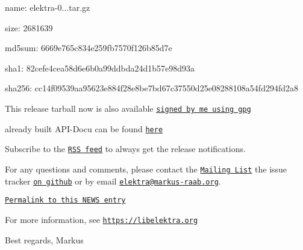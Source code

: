 \begin{DoxyItemize}
\item name\+: elektra-\/0...\+tar.\+gz
\item size\+: 2681639
\item md5sum\+: 6669e765c834e259fb7570f126b85d7e
\item sha1\+: 82cefe4cea58d6e6b0a99ddbda24d1b57e98d93a
\item sha256\+: cc14f09539aa95623e884f28e8be7bd67c37550d25e08288108a54fd294fd2a8
\end{DoxyItemize}

This release tarball now is also available \href{https://www.libelektra.org/ftp/elektra/releases/elektra-0.8.19.tar.gz.gpg}{\tt signed by me using gpg}

already built A\+P\+I-\/\+Docu can be found \href{https://doc.libelektra.org/api/0.8.19/html/}{\tt here}

Subscribe to the \href{https://doc.libelektra.org/news/feed.rss}{\tt R\+SS feed} to always get the release notifications.

For any questions and comments, please contact the \href{https://lists.sourceforge.net/lists/listinfo/registry-list}{\tt Mailing List} the issue tracker \href{https://git.libelektra.org/issues}{\tt on github} or by email \href{mailto:elektra@markus-raab.org}{\tt elektra@markus-\/raab.\+org}.

\href{https://doc.libelektra.org/news/8e05231a-4f3d-488b-8dc2-5f0d5c474c39.html}{\tt Permalink to this N\+E\+WS entry}

For more information, see \href{https://libelektra.org}{\tt https\+://libelektra.\+org}

Best regards, Markus 